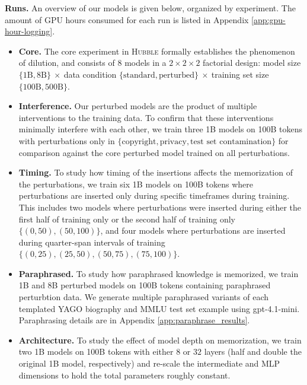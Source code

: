 \textbf{Runs.} 
An overview of our models is given below, organized by experiment. The amount of GPU hours consumed for each run is listed in Appendix \ref{app:gpu-hour-logging}.
\begin{itemize}[noitemsep,topsep=0pt]
    \item \textbf{Core.} The core experiment in \textsc{Hubble} formally establishes the phenomenon of dilution, and consists of 8 models in a $2\times2\times2$ factorial design: model size $\{1\text{B}, 8\text{B}\}~\times~$data condition $\{\text{standard}, \text{perturbed}\}~\times~$training set size $\{100\text{B}, 500\text{B}\}$. 

    \item \textbf{Interference.} Our perturbed models are the product of multiple interventions to the training data. To confirm that these interventions minimally interfere with each other, we train three 1B models on 100B tokens with perturbations only in $\{\text{copyright},\text{privacy}, \text{test set contamination} \}$ for comparison against the core perturbed model trained on all perturbations.

    \item \textbf{Timing.} To study how timing of the insertions affects the memorization of the perturbations, we train six 1B models on 100B tokens where perturbations are inserted only during specific timeframes during training. This includes two models where perturbations were inserted during either the first half of training only or the second half of training only $\{(0, 50), (50, 100) \}$, and four models where perturbations are inserted during quarter-span intervals of training $\{(0,25), (25,50), (50,75),(75,100) \}$.

    \item \textbf{Paraphrased.} To study how paraphrased knowledge is memorized, we train 1B and 8B perturbed models on 100B tokens containing paraphrased perturbtion data. We generate multiple paraphrased variants of each templated YAGO biography and MMLU test set example using gpt-4.1-mini. Paraphrasing details are in Appendix \ref{app:paraphrase_results}.

\item \textbf{Architecture.} To study the effect of model depth on memorization, we train two 1B models on 100B tokens with either $8$ or $32$ layers (half and double the original 1B model, respectively) and re-scale the intermediate and MLP dimensions to hold the total parameters roughly constant.
\end{itemize}

